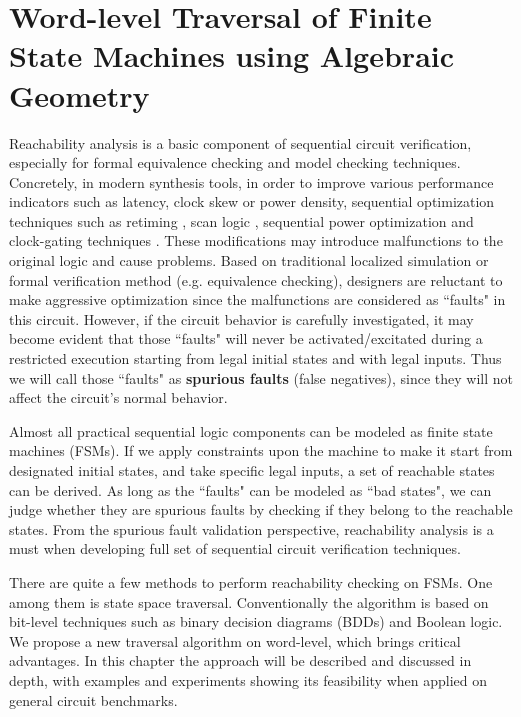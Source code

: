 \chapter{Word-level Traversal of Finite State Machines using Algebraic Geometry}
\label{ch:reacha}
Reachability analysis is a basic component of sequential circuit verification, especially for 
formal equivalence checking and model checking techniques. Concretely, in modern synthesis 
tools, in order to improve various performance indicators such as latency, clock skew or power
density, sequential optimization techniques such as retiming \cite{retiming}, scan logic \cite{scan},
sequential power optimization \cite{mathur2009power} and clock-gating techniques \cite{clockgating}.
These modifications may introduce malfunctions to the original logic and cause problems. 
Based on traditional localized simulation or formal verification method (e.g. equivalence checking), 
designers are reluctant to make aggressive optimization
since the malfunctions are considered as ``faults" in this circuit.
However, if the circuit behavior is carefully investigated, it may become evident that 
those ``faults" will never be activated/excitated during a restricted execution starting 
from legal initial states and with legal inputs. Thus we will call those ``faults" as 
{\bf spurious faults} (false negatives), since they will not affect the circuit's normal behavior.

Almost all practical sequential logic components can be modeled as finite state machines (FSMs). 
If we apply constraints upon the machine to make it start from designated initial states, and 
take specific legal inputs, a set of reachable states can be derived. 
As long as the ``faults" can be modeled as ``bad states", we can judge whether they are 
spurious faults by checking if they belong to the reachable states. From the spurious fault validation 
perspective, reachability analysis is a must when developing full set of sequential circuit verification
techniques.

There are quite a few methods to perform reachability checking on FSMs. One among them is 
state space traversal. Conventionally the algorithm is based on bit-level techniques such as
binary decision diagrams (BDDs) and Boolean logic. We propose a new traversal algorithm on word-level,
which brings critical advantages. In this chapter the approach will be described and discussed in depth, 
with examples and experiments showing its feasibility when applied on general circuit benchmarks.


